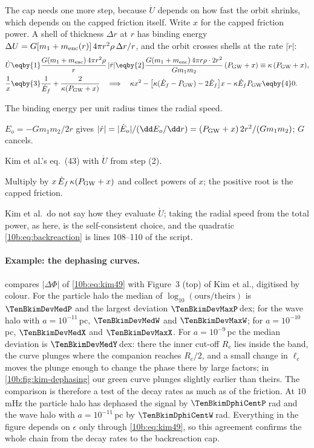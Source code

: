 The cap needs one more step, because $\dot U$ depends on how fast the orbit shrinks, which depends on the capped
friction itself. Write $x$ for the capped friction power. A shell of thickness $\Delta r$ at $r$ has binding energy
$\Delta U=G[m_1+m_{\rm enc}(r)]\,4\pi r^2\rho\,\Delta r/r$, and the orbit crosses shells at the rate $|\dot r|$:
\begin{align}
  \dot U&\eqby{1}\frac{G(m_1+m_{\rm enc})\,4\pi r^2\rho}{r}\,|\dot r|
  \eqby{2}\frac{G(m_1+m_{\rm enc})\,4\pi r\rho\cdot2r^2}{Gm_1m_2}\,(P_{\rm GW}+x)\equiv\kappa\,(P_{\rm GW}+x),\nonumber\\
  \frac1x&\eqby{3}\frac1{\dot E_f}+\frac{2}{\kappa(P_{\rm GW}+x)}
  \quad\Longrightarrow\quad
  \kappa x^2-\big[\kappa(\dot E_f-P_{\rm GW})-2\dot E_f\big]x-\kappa\dot E_fP_{\rm GW}\eqby{4}0 .
  \label{10b:eq:backreaction}
\end{align}
\begin{explain}
  \item The binding energy per unit radius times the radial speed.
  \item $E_o=-Gm_1m_2/2r$ gives $|\dot r|=|\dot E_o|/(\dd E_o/\dd r)=(P_{\rm GW}+x)\,2r^2/(Gm_1m_2)$; $G$ cancels.
  \item Kim et al.'s eq.~(43) with $\dot U$ from step (2).
  \item Multiply by $x\,\dot E_f\,\kappa(P_{\rm GW}+x)$ and collect powers of $x$; the positive root is the capped friction.
\end{explain}
Kim et al.\ do not say how they evaluate $\dot U$; taking the radial speed from the total power, as here, is the
self-consistent choice, and the quadratic \eqref{10b:eq:backreaction} is lines 108--110 of the script.

\paragraph{Example: the dephasing curves.}  compares $|\Delta\Phi|$ of
\eqref{10b:eq:kim49} with Figure~3 (top) of Kim et al., digitised by colour. For the particle halo the median of
$\log_{10}(\text{ours}/\text{theirs})$ is $\TenBkimDevMedP$ and the largest deviation $\TenBkimDevMaxP$\,dex; for the
wave halo with $a=10^{-11}$\,pc, $\TenBkimDevMedW$ and $\TenBkimDevMaxW$; for $a=10^{-10}$\,pc, $\TenBkimDevMedX$ and
$\TenBkimDevMaxX$. For $a=10^{-9}$\,pc the median deviation is $\TenBkimDevMedY$\,dex: there the inner cut-off $R_c$
lies inside the band, the curve plunges where the companion reaches $R_c/2$, and a small change in $\ell_c$ moves the
plunge enough to change the phase there by large factors; in \cref{10b:fig:kim-dephasing} our green curve plunges slightly earlier than theirs. The comparison is therefore a test of the decay rates as
much as of the friction. At $10$\,mHz the particle halo has dephased the signal by $\TenBkimDphiCentP$\,rad and the wave
halo with $a=10^{-11}$\,pc by $\TenBkimDphiCentW$\,rad. Everything in the figure depends on $\epsilon$ only through
\eqref{10b:eq:kim49}, so this agreement confirms the whole chain from the decay rates to the backreaction cap.

